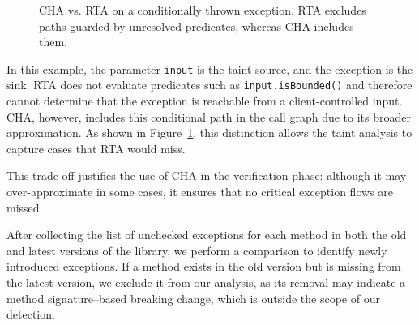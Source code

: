 \begin{figure}[t]
\centering
{}
\vspace{-1ex}
\caption{CHA vs. RTA on a conditionally thrown exception. RTA excludes paths guarded by unresolved predicates, whereas CHA includes them.}
\label{fig:rta-vs-cha}
\vspace{-2ex}
\end{figure}


In this example, the parameter \texttt{input} is the taint source, and the exception is the sink. RTA does not evaluate predicates such as \texttt{input.isBounded()} and therefore cannot determine that the exception is reachable from a client-controlled input. CHA, however, includes this conditional path in the call graph due to its broader approximation. As shown in Figure~\ref{fig:rta-vs-cha}, this distinction allows the taint analysis to capture cases that RTA would miss.

This trade-off justifies the use of CHA in the verification phase: although it may over-approximate in some cases, it ensures that no critical exception flows are missed.

After collecting the list of unchecked exceptions for each method in both the old and latest versions of the library, we perform a comparison to identify newly introduced exceptions. If a method exists in the old version but is missing from the latest version, we exclude it from our analysis, as its removal may indicate a method signature–based breaking change, which is outside the scope of our detection.


